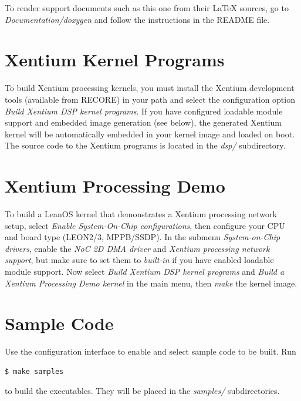To render support documents such as this one from their LaTeX sources, go
to \emph{Documentation/doxygen} and follow the instructions in the README file.




\section {Xentium Kernel Programs}

To build \gls{Xentium} processing kernels, you must install the Xentium
development tools (available from RECORE) in your path and select the
configuration option \emph{Build Xentium DSP kernel programs}.  If you have
configured loadable module support and embedded image generation (see below),
the generated Xentium kernel will be automatically embedded in your kernel
image and loaded on boot. \\

\noindent
The source code to the Xentium programs is located in the \emph{dsp/}
subdirectory.


\section {Xentium Processing Demo}

To build a LeanOS kernel that demonstrates a Xentium processing network setup,
select \emph{Enable System-On-Chip configurations}, then configure your CPU and
board type (LEON2/3, MPPB/SSDP). In the submenu \emph{System-on-Chip
drivers}, enable the \emph{NoC 2D DMA driver} and \emph{Xentium processing
network support}, but make sure to set them to \emph{built-in} if you have
enabled loadable module support. Now select \emph{Build Xentium DSP kernel
programs} and \emph{Build a Xentium Processing Demo kernel} in the main menu,
then \emph{make} the kernel image.

\section {Sample Code}

Use the configuration interface to enable and select sample code to be built.
Run

\begin{lstlisting}[language=bash]
  $ make samples
\end{lstlisting}

\noindent
to build the executables. They will be placed in the \emph{samples/}
subdirectories.



